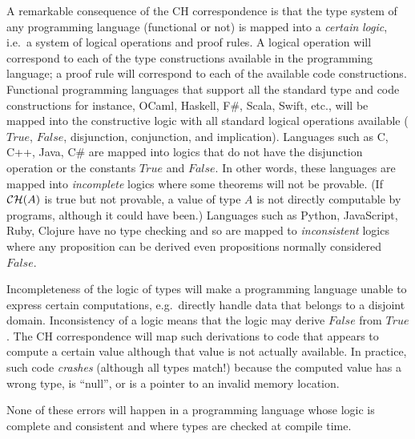 A remarkable consequence of the CH correspondence is that the type
system of any programming language (functional or not) is mapped into
a \emph{certain} \emph{logic}, i.e.~a system of logical operations
and proof rules. A logical operation will correspond to each of the
type constructions available in the programming language; a proof
rule will correspond to each of the available code constructions.
Functional programming languages that support all the standard type
and code constructions \textendash{} for instance, OCaml, Haskell,
F\#, Scala, Swift, etc., \textendash{} will be mapped into the constructive
logic with all standard logical operations available ($True$, $False$,
disjunction, conjunction, and implication). Languages such as C, C++,
Java, C\# are mapped into logics that do not have the disjunction
operation or the constants $True$ and $False$. In other words, these
languages are mapped into \emph{incomplete} logics where some theorems
will not be provable. (If ${\cal CH}(A)$ is true but not provable,
a value of type $A$ is not directly computable by programs, although
it could have been.) Languages such as Python, JavaScript, Ruby, Clojure
have no type checking and so are mapped to \emph{inconsistent} logics
where any proposition can be derived \textendash{} even propositions
normally considered $False$. 

Incompleteness of the logic of types will make a programming language
unable to express certain computations, e.g.~directly handle data
that belongs to a disjoint domain. Inconsistency of a logic means
that the logic may derive $False$ from $True$. The CH correspondence
will map such derivations to code that appears to compute a certain
value although that value is not actually available. In practice,
such code \emph{crashes} (although all types match!) because the computed
value has a wrong type, is ``null'', or is a pointer to an invalid
memory location.

None of these errors will happen in a programming language whose logic
is complete and consistent and where types are checked at compile
time. 

